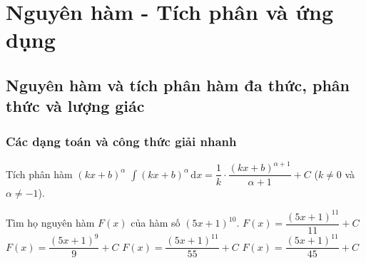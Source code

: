 \chapter{Nguyên hàm - Tích phân và ứng dụng}
\section{Nguyên hàm và tích phân hàm đa thức, phân thức và lượng giác}
\subsection{Các dạng toán và công thức giải nhanh}

\begin{dang}{Tích phân hàm $(kx+b)^{\alpha}$}
$\displaystyle\int\limits(kx+b)^{\alpha}\mathrm{\,d}x =\dfrac{1}{k} \cdot \dfrac{(kx+b)^{\alpha +1}}{\alpha +1}+C$  ($k \ne 0$ và $\alpha \ne -1$). 

\end{dang}
\begin{vd}%
Tìm họ nguyên hàm $F(x)$ của hàm số $(5x+1)^{10}$.
\choice
{$F(x) = \dfrac{(5x+1)^{11}}{11}+C$}
{$F(x) = \dfrac{(5x+1)^{9}}{9}+C$}
{\True $F(x) = \dfrac{(5x+1)^{11}}{55}+C$}
{$F(x) = \dfrac{(5x+1)^{11}}{45}+C$}
\end{vd}

